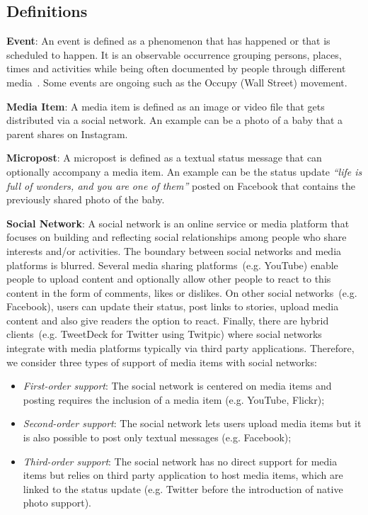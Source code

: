 \subsection{Definitions}
\textbf{Event}: An event is defined as a phenomenon that has happened or that is scheduled to happen. It is an observable occurrence grouping
persons, places, times and activities while being often documented by people through different media~\cite{Liu:ICMR11}. Some events
are ongoing such as the Occupy (Wall Street) movement.

\textbf{Media Item}: A media item is defined as an image or video file that gets distributed via a social network. An example can be a photo of a baby that
a parent shares on Instagram.

\textbf{Micropost}: A micropost is defined as a textual status message that can optionally accompany a media item. An example can be the status update
\emph{``life is full of wonders, and you are one of them''} posted on Facebook that contains the previously shared photo of the baby.

\textbf{Social Network}: A social network is an online service or media platform that focuses on building and reflecting social relationships among
people who share interests and/or activities. The boundary between social networks and media platforms is blurred.
Several media sharing platforms~(e.g. YouTube) enable people to upload content and optionally allow other people to react
to this content in the form of comments, likes or dislikes. On other social networks~(e.g. Facebook), users can update their status,
post links to stories, upload media content and also give readers the option to react. Finally, there are hybrid clients~(e.g. TweetDeck
for Twitter using Twitpic) where social networks integrate with media platforms typically via third party applications.
Therefore, we consider three types of support of media items with social networks:
\begin{itemize}
  \item \emph{First-order support}: The social network is centered on media items and posting requires the inclusion of a media item (e.g. YouTube, Flickr);
  \item \emph{Second-order support}: The social network lets users upload media items but it is also possible to post only textual messages (e.g. Facebook);
  \item \emph{Third-order support}: The social network has no direct support for media items but relies on third party application to host media items,
which are linked to the status update (e.g. Twitter before the introduction of native photo support).
\end{itemize}

